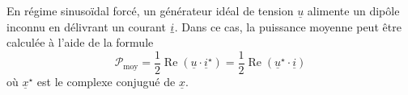 %
%
%
%
%
%



\hauteurLargeurCadreReponse		{8mm}{3.5cm}
\typeEntrainement				{} %
\initialisationEntrainement


En régime sinusoïdal forcé, un générateur idéal de tension $\underline{u}$
alimente un dipôle inconnu en délivrant un courant $\text{\ensuremath{\underline{i}}}$. 
Dans ce cas, la puissance moyenne peut être calculée à l'aide de la formule
\[
\mathcal{P}_{\text{moy}}=\dfrac{1}{2}\operatorname{Re}\left(\underline{u}\cdot \underline{i}^{\star}\right)=\dfrac{1}{2}\operatorname{Re}\left(\underline{u}^{\star}\cdot \underline{i}\right)
\]
 où $\underline{x}^{\star}$ est le complexe conjugué de $\underline{x}$.



\debutEntrainement

